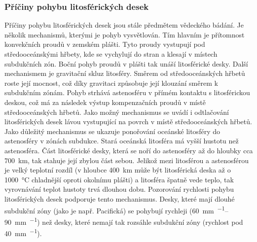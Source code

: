 \subsubsection{Příčiny pohybu litosférických desek}
Příčiny pohybu litosférických desek jsou stále předmětem vědeckého bádání. Je několik mechanismů, kterými je pohyb vysvětlován. Tím hlavním je přítomnost konvekčních proudů v zemském plášti. Tyto proudy vystupují pod středooceánskými hřbety, kde se vychylují do stran a klesají v místech subdukčních zón. Boční pohyb proudů v plášti tak unáší litosférické desky. Další mechanismem je gravitační skluz litosféry. Směrem od středooceánských hřbetů roste její mocnost, což díky gravitaci způsobuje její klouzání směrem k subdukčním zónám. Pohyb strhává astenosféru v přímém kontaktu s litosférickou deskou, což má za následek výstup kompenzačních proudů v místě středooceánských hřbetů. Jako možný mechanismus se uvádí i odtlačování litosférických desek lávou vystupující na povrch v místě středooceánských hřbetů. Jako důležitý mechanismus se ukazuje ponořování oceánské litosféry do astenosféry v zónách subdukce. Stará oceánská litosféra má vyšší hustotu než astenosféra. Část litosférické desky, která se noří do astenosféry až do hloubky cca \SI{700}{\kilo\metre}, tak stahuje její zbylou část sebou. Jelikož mezi litosférou a astenosférou je velký teplotní rozdíl (v hloubce \SI{400}{\kilo\metre} může být litosférická deska až o \SI{1000}{\degreeCelsius} chladnější oproti okolnímu plášti) a litosféra špatně vede teplo, tak vyrovnávání teplot hustoty trvá dlouhou dobu. Pozorování rychlosti pohybu litosférických desek podporuje tento mechanismus. Desky, které mají dlouhé subdukční zóny (jako je např. Pacifická) se pohybují rychleji (\SIrange{60}{90}{\milli\metre\per\rok}) než desky, které nemají tak rozsáhle subdukční zóny (rychlost pod \SI{40}{\milli\metre\per\rok}).

